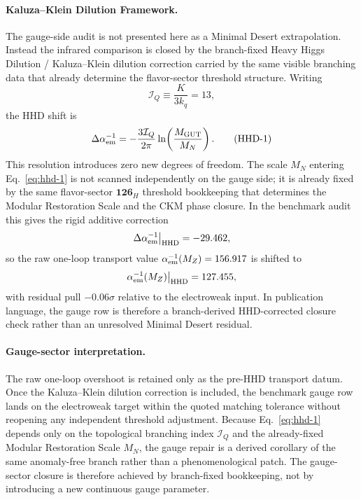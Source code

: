 \documentclass[11pt]{article}
\begin{document}
\paragraph{Kaluza--Klein Dilution Framework.}
The gauge-side audit is not presented here as a Minimal Desert extrapolation. Instead the infrared comparison is closed by the branch-fixed Heavy Higgs Dilution / Kaluza--Klein dilution correction carried by the same visible branching data that already determine the flavor-sector threshold structure. Writing
\begin{equation}
 \mathcal I_Q\equiv \frac{K}{3k_q}=13,
\end{equation}
the HHD shift is
\begin{equation}
 \Delta \alpha_{\rm em}^{-1}
 =
 - \frac{3 \mathcal I_Q}{2\pi}\ln\!\left(\frac{M_{\rm GUT}}{M_N}\right).
 \tag{HHD-1}
 \label{eq:hhd-1}
\end{equation}
This resolution introduces zero new degrees of freedom. The scale $M_N$ entering Eq.~\eqref{eq:hhd-1} is not scanned independently on the gauge side; it is already fixed by the same flavor-sector $\mathbf{126}_H$ threshold bookkeeping that determines the Modular Restoration Scale and the CKM phase closure. In the benchmark audit this gives the rigid additive correction
\begin{equation}
 \Delta \alpha_{\rm em}^{-1}\big|_{\rm HHD} = -29.462,
\end{equation}
so the raw one-loop transport value $\alpha^{-1}_{\rm em}(M_Z)=156.917$ is shifted to
\begin{equation}
 \alpha^{-1}_{\rm em}(M_Z)\big|_{\rm HHD}=127.455,
\end{equation}
with residual pull $-0.06\sigma$ relative to the electroweak input. In publication language, the gauge row is therefore a branch-derived HHD-corrected closure check rather than an unresolved Minimal Desert residual. %

\paragraph{Gauge-sector interpretation.}
The raw one-loop overshoot is retained only as the pre-HHD transport datum. Once the Kaluza--Klein dilution correction is included, the benchmark gauge row lands on the electroweak target within the quoted matching tolerance without reopening any independent threshold adjustment. Because Eq.~\eqref{eq:hhd-1} depends only on the topological branching index $\mathcal I_Q$ and the already-fixed Modular Restoration Scale $M_N$, the gauge repair is a derived corollary of the same anomaly-free branch rather than a phenomenological patch. The gauge-sector closure is therefore achieved by branch-fixed bookkeeping, not by introducing a new continuous gauge parameter.
\end{document}
